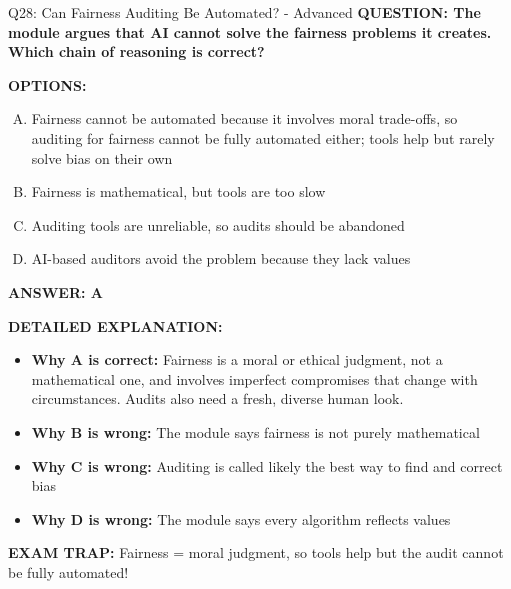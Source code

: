 \documentclass[8pt]{beamer}
\begin{document}
\begin{frame}[shrink=6]{Q28: Can Fairness Auditing Be Automated? - Advanced}
\fontsize{6.5}{7.5}\selectfont
\textbf{QUESTION: The module argues that AI cannot solve the fairness problems it creates. Which chain of reasoning is correct?}

\vspace{0.1cm}
\textbf{OPTIONS:}
\begin{enumerate}[A.]
\item Fairness cannot be automated because it involves moral trade-offs, so auditing for fairness cannot be fully automated either; tools help but rarely solve bias on their own
\item Fairness is mathematical, but tools are too slow
\item Auditing tools are unreliable, so audits should be abandoned
\item AI-based auditors avoid the problem because they lack values
\end{enumerate}

\vspace{0.1cm}
\textcolor{myblue}{\textbf{ANSWER: A}}

\vspace{0.1cm}
\textbf{DETAILED EXPLANATION:}
\begin{itemize}
\item \textbf{Why A is correct:} Fairness is a moral or ethical judgment, not a mathematical one, and involves imperfect compromises that change with circumstances. Audits also need a fresh, diverse human look.
\item \textbf{Why B is wrong:} The module says fairness is not purely mathematical
\item \textbf{Why C is wrong:} Auditing is called likely the best way to find and correct bias
\item \textbf{Why D is wrong:} The module says every algorithm reflects values
\end{itemize}

\textcolor{myred}{\textbf{EXAM TRAP:}} Fairness = moral judgment, so tools help but the audit cannot be fully automated!
\end{frame}
\end{document}
